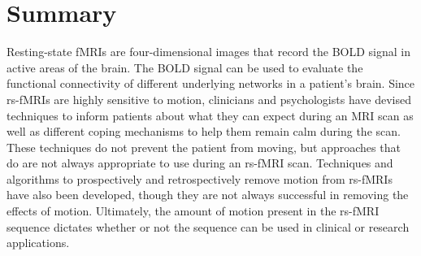 \section{Summary}

Resting-state fMRIs are four-dimensional images that record the BOLD signal in active areas of the brain. The BOLD signal can be used to evaluate the functional connectivity of different underlying networks in a patient's brain. Since rs-fMRIs are highly sensitive to motion, clinicians and psychologists have devised techniques to inform patients about what they can expect during an MRI scan as well as different coping mechanisms to help them remain calm during the scan. These techniques do not prevent the patient from moving, but approaches that do are not always appropriate to use during an rs-fMRI scan. Techniques and algorithms to prospectively and retrospectively remove motion from rs-fMRIs have also been developed, though they are not always successful in removing the effects of motion. Ultimately, the amount of motion present in the rs-fMRI sequence dictates whether or not the sequence can be used in clinical or research applications.